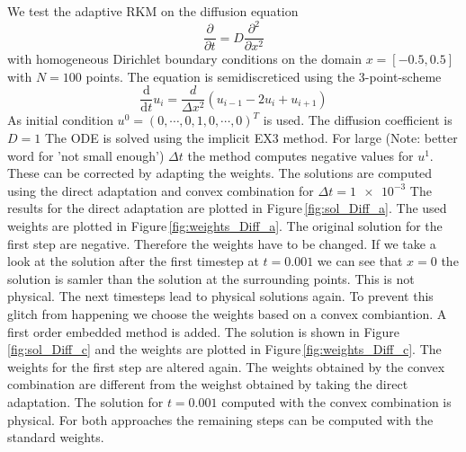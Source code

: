 \documentclass[a4paper]{scrartcl}
\numberwithin{equation}{section}
\theoremstyle{plain}
\theoremstyle{definition}
\numberwithin{theorem}{section}
\newcommand{\dt}{{\Delta t}}
\newcommand{\1}{\mathbbm{1}}
\begin{document}
We test the adaptive RKM on the diffusion equation 
\begin{equation}
\frac{\partial }{\partial t} = D \frac{\partial^2}{\partial x^2}
\end{equation}
with homogeneous Dirichlet boundary conditions on the domain $x = [-0.5,0.5]$ with $N=100$ points. The equation is semidiscreticed using the 3-point-scheme
\begin{equation}
\frac{\mathrm d}{\mathrm d t} u_i = \frac{d}{\Delta x^2} \left( u_{i-1} - 2u_i + u_{i+1} \right)
\end{equation}
As initial condition $u^0 = (0,\cdots,0,1,0,\cdots,0)^T$ is used. The diffusion coefficient is$D=1$
The ODE is solved using the implicit EX3 method. 
For large (Note: better word for 'not small enough') $\dt$ the method computes negative values for $u^1$.
These can be corrected by adapting the weights. 
The solutions are computed using the direct adaptation and convex combination for $\dt = \num{1e-3}$
The results for the direct adaptation are plotted in Figure\,\ref{fig:sol_Diff_a}. The used weights are plotted in Figure\,\ref{fig:weights_Diff_a}.
The original solution for the first step are negative. Therefore the weights have to be changed.
If we take a look at the solution after the first timestep at $t=0.001$ we can see that $x=0$ the solution is samler than the solution at the surrounding points. 
This is not physical. 
The next timesteps lead to physical solutions again.
To prevent this glitch from happening we choose the weights based on a convex combiantion.
A first order embedded method is added. The solution is shown in Figure\,\ref{fig:sol_Diff_c} and the weights are plotted in Figure\,\ref{fig:weights_Diff_c}.
The weights for the first step are altered again.
The weights obtained by the convex combination are different from the weighst obtained
by taking the direct adaptation.
The solution for $t=0.001$ computed with the convex combination is physical.
For both approaches the remaining steps can be computed with the standard weights.
\end{document}
